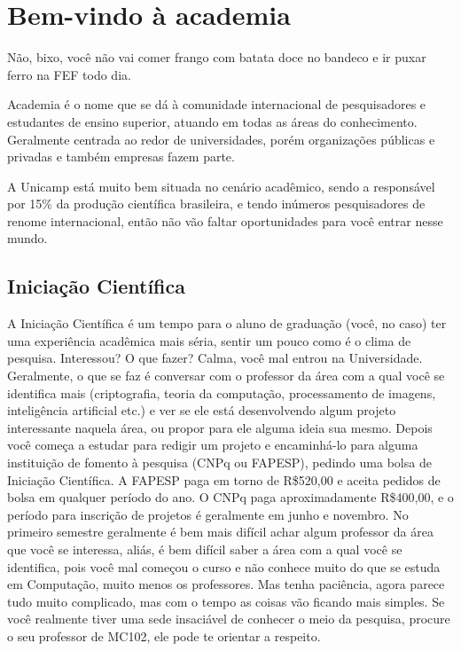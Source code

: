 
\section{Bem-vindo à academia}

Não, bixo, você não vai comer frango com batata doce no bandeco e ir puxar ferro
na FEF todo dia.  

Academia é o nome que se dá à comunidade internacional de pesquisadores e
estudantes de ensino superior, atuando em todas as áreas do
conhecimento. Geralmente centrada ao redor de universidades, porém organizações
públicas e privadas e também empresas fazem parte.

A Unicamp está muito bem situada no cenário acadêmico, sendo a responsável por
15\% da produção científica brasileira, e tendo inúmeros pesquisadores de renome
internacional, então não vão faltar oportunidades para você entrar nesse mundo.

\subsection{Iniciação Científica}

A Iniciação Científica é um tempo para o aluno de graduação (você, no caso) ter
uma experiência acadêmica mais séria, sentir um pouco como é o clima de
pesquisa. Interessou? O que fazer? Calma, você mal entrou na Universidade.
Geralmente, o que se faz é conversar com o professor da área com a qual você se
identifica mais (criptografia, teoria da computação, processamento de imagens,
inteligência artificial etc.) e ver se ele está desenvolvendo algum projeto
interessante naquela área, ou propor para ele alguma ideia sua mesmo.  Depois
você começa a estudar para redigir um projeto e encaminhá-lo para alguma
instituição de fomento à pesquisa (CNPq ou FAPESP), pedindo uma bolsa de
Iniciação Científica. A FAPESP paga em torno de R\$520,00 e aceita pedidos de
bolsa em qualquer período do ano. O CNPq paga aproximadamente R\$400,00, e o
período para inscrição de projetos é geralmente em junho e novembro. No primeiro
semestre geralmente é bem mais difícil achar algum professor da área que você se
interessa, aliás, é bem difícil saber a área com a qual você se identifica, pois
você mal começou o curso e não conhece muito do que se estuda em Computação,
muito menos os professores. Mas tenha paciência, agora parece tudo muito
complicado, mas com o tempo as coisas vão ficando mais simples. Se você
realmente tiver uma sede insaciável de conhecer o meio da pesquisa, procure o
seu professor de MC102, ele pode te orientar a respeito.

